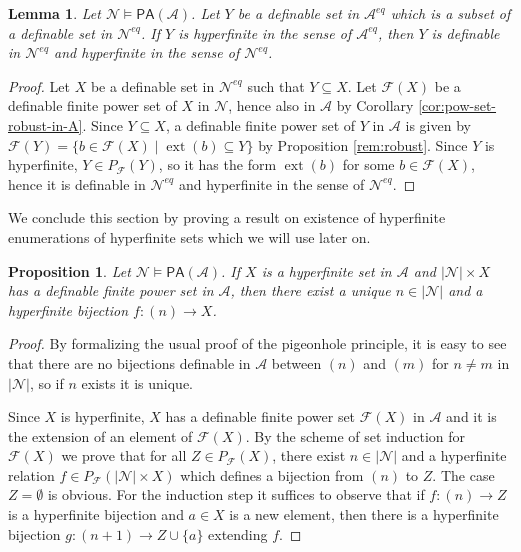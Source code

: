 \documentclass{amsart}
\newcommand{\ca}{\mathcal}
\theoremstyle{plain}
\newtheorem{prop}[thm]{Proposition}
\newtheorem{lem}[thm]{Lemma}
\theoremstyle{definition}
\newcommand{\F}{\mathcal{F}}
\newcommand{\pF}{P_{\ca F}}
\newcommand{\ext}[1]{\operatorname{ext}(#1)}
\newcommand{\PA}{\mathsf{PA}}
\begin{document}
\begin{lem} \label{lem:robust-hyperfinite}
Let $\ca N\models \PA(\ca A)$. Let $Y$ be a definable set in $\ca A^{eq}$ which is a subset of a definable set in $\ca N^{eq}$. If $Y$ is hyperfinite in the sense of $\ca A^{eq}$, then $Y$ is definable in $\ca N^{eq}$ and hyperfinite in the sense of $\ca N^{eq}$. 
\end{lem}
\begin{proof}
Let $X$ be a definable set in $\ca N^{eq}$ such that $Y \subseteq X$. 
Let $\F(X)$ be a definable finite power set of $X$ in $\ca N$, hence also in $\ca A$ by Corollary \ref{cor:pow-set-robust-in-A}.
    Since $Y\subseteq X$, a definable finite power set of $Y$ in $\ca A$ is given by $\F(Y) = \{b\in \F(X) \mid \ext b \subseteq Y\}$ by Proposition \ref{rem:robust}. Since $Y$ is hyperfinite, $Y\in \pF(Y)$, so it has the form $\ext b$ for some $b\in \F(X)$, hence it is definable in $\ca N^{eq}$ and hyperfinite in the sense of $\ca N^{eq}$.  
\end{proof}

We conclude this section by proving a result on existence of hyperfinite enumerations of hyperfinite sets which we will use later on.
 
\begin{prop}\label{prop:enumeration}
Let $\ca N \models \PA(\ca A)$. 
If $X$ is a hyperfinite set in $\ca A$ and $|\ca N| \times X$ has a definable finite power set in $\ca A$, then there exist a unique $n\in |\ca N|$ and a hyperfinite bijection $f:(n)\to X$.
\end{prop}
\begin{proof} 
By formalizing the usual proof of the pigeonhole principle, it is easy to see that there are no bijections definable in $\ca A$ between $(n)$ and $(m)$ for $n\neq m$ in $|\ca N|$, so if $n$ exists it is unique. 

Since $X$ is hyperfinite, $X$ has a definable finite power set $\F(X)$ in $\ca A$ and it is the extension of an element of $\F(X)$. By the scheme of set induction for $\F(X)$ we prove that for all $Z\in \pF(X)$, there exist $n\in |\ca N|$ and a hyperfinite relation $f\in \pF(|\ca N|\times X)$ which defines a bijection from $(n)$ to $Z$. The case $Z=\emptyset$ is obvious. For the induction step it suffices to observe that if $f:(n)\to Z$ is a hyperfinite bijection and $a\in X$ is a new element, then there is a hyperfinite bijection $g:(n+1)\to Z\cup \{a\}$ extending $f$.  
\end{proof}
\end{document}
